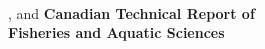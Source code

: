 \thispagestyle{fancyplain}
\noindent
\begin{flushleft}
\LARGE
\textbf{\titlecap{\trTitle{}}}\\
\vfill
\Large
\trAuthALong{}, and \trAuthBLong{}
\vfill
\trAddy{}
\vfill
\trYear{}
\vfill
\LARGE
\textbf{Canadian Technical Report of\\
Fisheries and Aquatic Sciences \trReportNum{}}
\cfoot{}
\end{flushleft}
\clearpage
